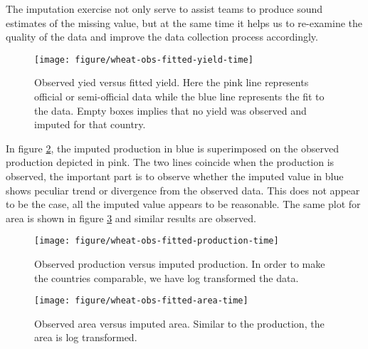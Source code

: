 \documentclass[nojss]{jss}\usepackage[]{graphicx}\usepackage[]{color}
\makeatletter
\def\maxwidth{ %
  \ifdim\Gin@nat@width>\linewidth
    \linewidth
  \else
    \Gin@nat@width
  \fi
}
\newenvironment{knitrout}{}{} %
\makeatother
\begin{document}
The imputation exercise not only serve to assist teams to produce
sound estimates of the missing value, but at the same time it helps us
to re-examine the quality of the data and improve the data collection
process accordingly.


\begin{knitrout}
\color{fgcolor}\begin{figure}[!ht]


{\centering \texttt{[image: figure/wheat-obs-fitted-yield-time]} 

}

\caption[Observed yied versus fitted yield]{Observed yied versus fitted yield. Here the pink line represents official or semi-official data while the blue line represents the fit to the data. Empty boxes implies that no yield was observed and imputed for that country.\label{fig:wheat-obs-fitted-yield-time}}
\end{figure}


\end{knitrout}


In figure \ref{fig:wheat-obs-fitted-production-time}, the imputed
production in blue is superimposed on the observed production depicted
in pink. The two lines coincide when the production is observed, the
important part is to observe whether the imputed value in blue shows
peculiar trend or divergence from the observed data. This does not
appear to be the case, all the imputed value appears to be
reasonable. The same plot for area is shown in figure
\ref{fig:wheat-obs-fitted-area-time} and similar results are observed.

\begin{knitrout}
\color{fgcolor}\begin{figure}[!ht]


{\centering \texttt{[image: figure/wheat-obs-fitted-production-time]} 

}

\caption[Observed production versus imputed production]{Observed production versus imputed production. In order to make the countries comparable, we have log transformed the data.\label{fig:wheat-obs-fitted-production-time}}
\end{figure}


\end{knitrout}


\begin{knitrout}
\color{fgcolor}\begin{figure}[!ht]


{\centering \texttt{[image: figure/wheat-obs-fitted-area-time]} 

}

\caption[Observed area versus imputed area]{Observed area versus imputed area. Similar to the production, the area is log transformed.\label{fig:wheat-obs-fitted-area-time}}
\end{figure}


\end{knitrout}
\end{document}
